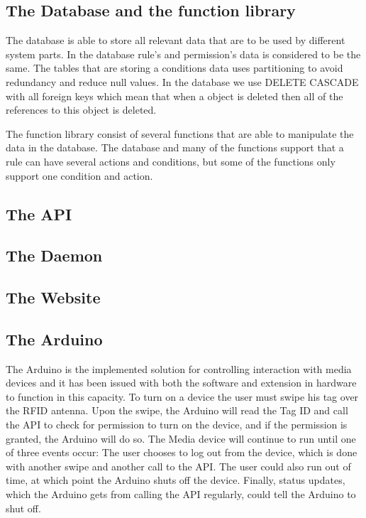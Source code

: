 \subsection*{The Database and the function library}
The database is able to store all relevant data that are to be used by different system parts. In the database rule's and permission's data is considered to be the same. The tables that are storing a conditions data uses partitioning to avoid redundancy and reduce null values. In the database we use DELETE CASCADE with all foreign keys which mean that when a object is deleted then all of the references to this object is deleted.

The function library consist of several functions that are able to manipulate the data in the database. The database and many of the functions support that a rule can have several actions and conditions, but some of the functions only support one condition and action.
 
\subsection*{The API}
\subsection*{The Daemon}
\subsection*{The Website}
\subsection*{The Arduino}
The Arduino is the implemented solution for controlling interaction with media devices and it has been issued with both the software and extension in hardware to function in this capacity.
To turn on a device the user must swipe his tag over the RFID antenna.
Upon the swipe, the Arduino will read the Tag ID and call the API to check for permission to turn on the device, and if the permission is granted, the Arduino will do so.
The Media device will continue to run until one of three events occur: The user chooses to log out from the device, which is done with another swipe and another call to the API. The user could also run out of time, at which point the Arduino shuts off the device. Finally, status updates, which the Arduino gets from calling the API regularly, could tell the Arduino to shut off.